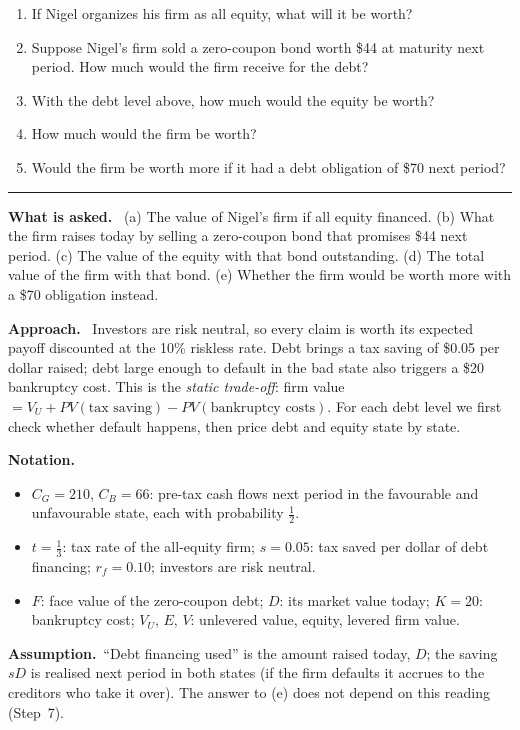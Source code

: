 \documentclass[11pt,a4paper]{article}
\numberwithin{equation}{section}
\newcommand{\notation}{\par\smallskip\noindent\textbf{Notation.}}
\newcommand{\assumption}{\par\smallskip\noindent\textbf{Assumption.}~}
\newcommand{\asked}{\par\medskip\noindent\textbf{What is asked.}~}
\newcommand{\approach}{\par\smallskip\noindent\textbf{Approach.}~}
\newcommand{\stmtend}{\par\endgroup\nopagebreak\noindent\rule{\linewidth}{0.4pt}\par\medskip}
\begin{document}
\begin{enumerate}
\def\labelenumi{\alph{enumi}.}
\item
  If Nigel organizes his firm as all equity, what will it be worth?
\item
  Suppose Nigel's firm sold a zero-coupon bond worth \$44 at maturity next period. How much would
  the firm receive for the debt?
\item
  With the debt level above, how much would the equity be worth?
\item
  How much would the firm be worth?
\item
  Would the firm be worth more if it had a debt obligation of \$70 next period?
\end{enumerate}
\stmtend

\asked
(a) The value of Nigel's firm if all equity financed.
(b) What the firm raises today by selling a zero-coupon bond that promises \$44 next period.
(c) The value of the equity with that bond outstanding.
(d) The total value of the firm with that bond.
(e) Whether the firm would be worth more with a \$70 obligation instead.

\approach
Investors are risk neutral, so every claim is worth its expected payoff discounted at the 10\%
riskless rate. Debt brings a tax saving of \$0.05 per dollar raised; debt large enough to default
in the bad state also triggers a \$20 bankruptcy cost. This is the \emph{static trade-off}: firm
value $=V_U+\mathit{PV}(\text{tax saving})-\mathit{PV}(\text{bankruptcy costs})$. For each debt
level we first check whether default happens, then price debt and equity state by state.

\notation
\begin{itemize}
  \item $C_G=210$, $C_B=66$: pre-tax cash flows next period in the favourable and unfavourable state, each with probability $\tfrac12$.
  \item $t=\tfrac13$: tax rate of the all-equity firm; $s=0.05$: tax saved per dollar of debt financing; $r_f=0.10$; investors are risk neutral.
  \item $F$: face value of the zero-coupon debt; $D$: its market value today; $K=20$: bankruptcy cost; $V_U$, $E$, $V$: unlevered value, equity, levered firm value.
\end{itemize}

\assumption ``Debt financing used'' is the amount raised today, $D$; the saving $sD$ is
realised next period in both states (if the firm defaults it accrues to the creditors who take
it over). The answer to (e) does not depend on this reading (Step~7).
\end{document}
